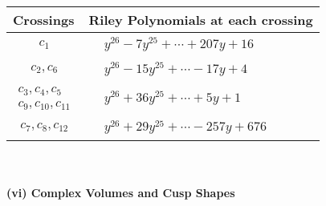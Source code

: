 \documentclass[1p]{elsarticle_modified}
\theoremstyle{definition}
\begin{document}
\begin{tabular}{m{50pt}|m{274pt}}
Crossings & \hspace{64pt}Riley Polynomials at each crossing \\
\hline $$\begin{aligned}c_{1}\end{aligned}$$&$\begin{aligned}
&y^{26}-7 y^{25}+\cdots+207 y+16
\end{aligned}$\\
\hline $$\begin{aligned}c_{2},c_{6}\end{aligned}$$&$\begin{aligned}
&y^{26}-15 y^{25}+\cdots-17 y+4
\end{aligned}$\\
\hline $$\begin{aligned}c_{3},c_{4},c_{5}\\c_{9},c_{10},c_{11}\end{aligned}$$&$\begin{aligned}
&y^{26}+36 y^{25}+\cdots+5 y+1
\end{aligned}$\\
\hline $$\begin{aligned}c_{7},c_{8},c_{12}\end{aligned}$$&$\begin{aligned}
&y^{26}+29 y^{25}+\cdots-257 y+676
\end{aligned}$\\
\hline
\end{tabular}\\~\\
\newpage\flushleft \textbf{(vi) Complex Volumes and Cusp Shapes}
\end{document}
